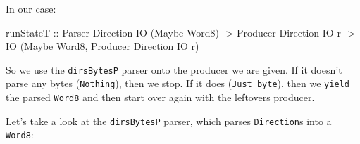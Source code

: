 \documentclass[]{article}
\newenvironment{Shaded}{}{}
\newcommand{\KeywordTok}[1]{\textcolor[rgb]{0.00,0.44,0.13}{\textbf{{#1}}}}
\newcommand{\DataTypeTok}[1]{\textcolor[rgb]{0.56,0.13,0.00}{{#1}}}
\newcommand{\DecValTok}[1]{\textcolor[rgb]{0.25,0.63,0.44}{{#1}}}
\newcommand{\CommentTok}[1]{\textcolor[rgb]{0.38,0.63,0.69}{\textit{{#1}}}}
\newcommand{\OtherTok}[1]{\textcolor[rgb]{0.00,0.44,0.13}{{#1}}}
\newcommand{\FunctionTok}[1]{\textcolor[rgb]{0.02,0.16,0.49}{{#1}}}
\newcommand{\NormalTok}[1]{{#1}}
\begin{document}
In our case:

\begin{Shaded}
\begin{Highlighting}[]
\OtherTok{runStateT ::} \DataTypeTok{Parser}   \DataTypeTok{Direction} \DataTypeTok{IO} \NormalTok{(}\DataTypeTok{Maybe} \DataTypeTok{Word8}\NormalTok{)}
          \OtherTok{->} \DataTypeTok{Producer} \DataTypeTok{Direction} \DataTypeTok{IO} \NormalTok{r}
          \OtherTok{->} \DataTypeTok{IO} \NormalTok{(}\DataTypeTok{Maybe} \DataTypeTok{Word8}\NormalTok{, }\DataTypeTok{Producer} \DataTypeTok{Direction} \DataTypeTok{IO} \NormalTok{r)}
\end{Highlighting}
\end{Shaded}

So we use the \texttt{dirsBytesP} parser onto the producer we are given. If it
doesn't parse any bytes (\texttt{Nothing}), then we stop. If it does
(\texttt{Just\ byte}), then we \texttt{yield} the parsed \texttt{Word8} and then
start over again with the leftovers producer.

Let's take a look at the \texttt{dirsBytesP} parser, which parses
\texttt{Direction}s into a \texttt{Word8}:

\begin{Shaded}
\end{Shaded}
\end{document}
